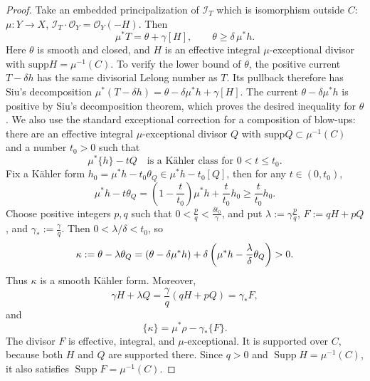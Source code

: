 \documentclass[reqno]{amsart}
\theoremstyle{remark}
\def\N{\mathbb{N}}
\newcommand{\supp}{\text{supp}}
\def\cI{{\mathcal I}}
\def\cO{{\mathcal O}}
\theoremstyle{plain}
\begin{document}
\begin{proof}
 Take an embedded principalization of $\cI_T$ which is isomorphism outside $C$: $\mu:Y\to X$, $\cI_T\cdot\cO_Y=\cO_Y(-H)$.  Then 
\begin{equation}\label{eq:numerical-resolved-current}
 \mu^*T=\theta+\gamma[H],
 \qquad
 \theta\geq\delta\,\mu^*h.
\end{equation}
Here $\theta$ is smooth and closed, and
$H$ is an effective integral $\mu$-exceptional divisor with $\supp  H=\mu^{-1}(C)$. To verify the lower bound of $\theta$, the positive current $T-\delta h$ has the same divisorial Lelong number as $T$. Its pullback therefore has Siu's decomposition $\mu^*(T-\delta h)=\theta-\delta\mu^*h+\gamma [H]$. The current $\theta-\delta\mu^*h$ is positive by Siu's decomposition theorem, which proves the desired inequality for $\theta$. %
We also use the standard exceptional correction for a composition of
blow-ups: there are an effective integral $\mu$-exceptional divisor
$Q$ with $\supp Q\subset \mu^{-1}(C)$ and a number $t_0>0$ such that
\begin{equation}\label{eq:exceptional-kahler-class}
 \mu^*\{h\}-t{Q}
 \quad\text{is a K\"ahler class for }0<t\leq t_0.
\end{equation}
Fix a K\"ahler form $h_0=\mu^*h-t_0\theta_{Q}\in \mu^*h-t_0[Q]$, then for any $t\in (0,t_0)$, \[\mu^*h-t\theta_Q=(1-\frac{t}{t_0})\mu^*h+\frac{t}{t_0}h_0\geq \frac{t}{t_0}h_0.\] 
Choose positive integers $p,q$ such that $0<\frac pq<\frac{\delta t_0}{\gamma}$, and put $
 \lambda:=\gamma\frac pq$, $ F:=qH+pQ$, and $\gamma_*:=\frac{\gamma}{q}$.
Then $0<\lambda/\delta<t_0$, so
\begin{equation}
 \kappa
 :=\theta-\lambda\theta_Q \notag=(\theta-\delta\mu^*h)
   +\delta\left(
      \mu^*h-\frac{\lambda}{\delta}\theta_Q
    \right)>0.       \label{eq:fixed-kappa-numerical}
\end{equation}  Thus $\kappa$ is a smooth
K\"ahler form.  Moreover,
\[
 \gamma H+\lambda Q
 =\frac{\gamma}{q}(qH+pQ)
 =\gamma_*F,
\]
and
\begin{equation}\label{eq:fixed-kappa-class}
 \{\kappa\}=\mu^*\rho-\gamma_*\{F\}.
\end{equation}
The divisor $F$ is effective, integral, and $\mu$-exceptional.  It
is supported over $C$, because both $H$ and $Q$ are supported
there.  Since $q>0$ and $\operatorname{Supp}H=\mu^{-1}(C)$, it also
satisfies $\operatorname{Supp}F=\mu^{-1}(C)$.


\end{proof}
\end{document}
